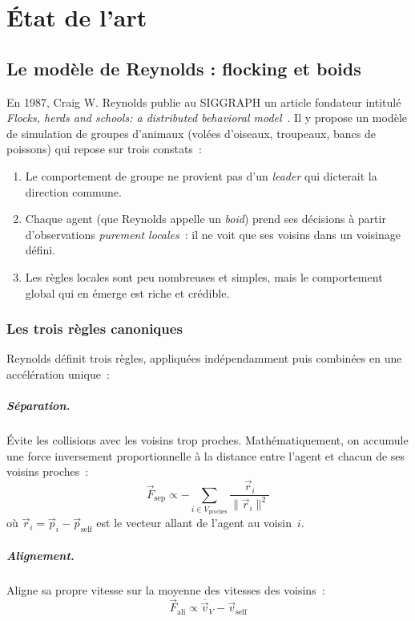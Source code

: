 \chapter{État de l'art}
\label{chap:etat-de-lart}

\section{Le modèle de Reynolds : flocking et boids}

En 1987, Craig W. Reynolds publie au SIGGRAPH un article fondateur
intitulé \emph{Flocks, herds and schools: a distributed behavioral
model}~\cite{reynolds1987flocks}. Il y propose un modèle de simulation
de groupes d'animaux (volées d'oiseaux, troupeaux, bancs de poissons)
qui repose sur trois constats~:

\begin{enumerate}
  \item Le comportement de groupe ne provient pas d'un \emph{leader}
    qui dicterait la direction commune.
  \item Chaque agent (que Reynolds appelle un \emph{boid}) prend ses
    décisions à partir d'observations \emph{purement locales}~: il
    ne voit que ses voisins dans un voisinage défini.
  \item Les règles locales sont peu nombreuses et simples, mais le
    comportement global qui en émerge est riche et crédible.
\end{enumerate}

\subsection{Les trois règles canoniques}

Reynolds définit trois règles, appliquées indépendamment puis
combinées en une accélération unique~:

\paragraph{Séparation.} Évite les collisions avec les voisins trop
proches. Mathématiquement, on accumule une force inversement
proportionnelle à la distance entre l'agent et chacun de ses voisins
proches~:
\[
  \vec{F}_{\text{sep}} \propto -\sum_{i \in V_{\text{proches}}} \frac{\vec{r}_i}{\|\vec{r}_i\|^2}
\]
où $\vec{r}_i = \vec{p}_i - \vec{p}_{\text{self}}$ est le vecteur
allant de l'agent au voisin~$i$.

\paragraph{Alignement.} Aligne sa propre vitesse sur la moyenne des
vitesses des voisins~:
\[
  \vec{F}_{\text{ali}} \propto \overline{\vec{v}}_V - \vec{v}_{\text{self}}
\]

